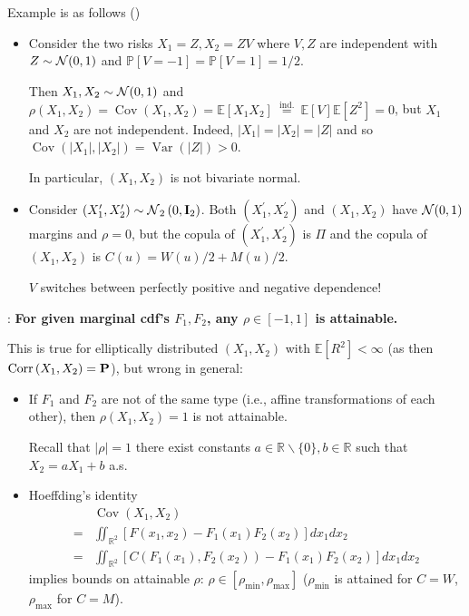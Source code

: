 Example is as follows ()
\begin{itemize}[leftmargin=*]
    \item Consider the two risks $X_{1}=Z, X_{2}=Z V$
where $V, Z$ are independent with $Z \sim \operatorname{\mathcal{N}}(0,1)$ and $\mathbb{P}[V=-1]=\mathbb{P}[V=1]=1 / 2$.

Then $X_{1}, X_{2} \sim \operatorname{\mathcal{N}}(0,1)$ and $\rho\left(X_{1}, X_{2}\right)=\operatorname{Cov}\left(X_{1}, X_{2}\right)=\mathbb{E}\left[X_{1} X_{2}\right] \stackrel{\text { ind. }}{=} \mathbb{E}[V] \mathbb{E}\left[Z^{2}\right]=0$, but $X_{1}$ and $X_{2}$ are not independent. Indeed, 
$\left|X_{1}\right|=\left|X_{2}\right|=|Z|$ and so $ \operatorname{Cov}\left(\left|X_{1}\right|,\left|X_{2}\right|\right)=\operatorname{Var}(|Z|)>0
$.


In particular, $\left(X_{1}, X_{2}\right)$ is not bivariate normal.

    \item Consider $\left(X_{1}^{\prime}, X_{2}^{\prime}\right) \sim \operatorname{\mathcal{N}}_{2}\left(0, \operatorname{\boldsymbol{\mathbf{I}}}_{2}\right)$. Both $\left(X_{1}^{\prime}, X_{2}^{\prime}\right)$ and $\left(X_{1}, X_{2}\right)$ have $\operatorname{\mathcal{N}}(0,1)$ margins and $\rho=0$, but the copula of $\left(X_{1}^{\prime}, X_{2}^{\prime}\right)$ is $\Pi$ and the copula of $\left(X_{1}, X_{2}\right)$ is $C(u)=W(u) / 2+M(u) / 2$.
    
    $V$ switches between perfectly positive and negative dependence!
\end{itemize}


: \textbf{For given marginal cdf's $F_{1}, F_{2}$, any $\rho \in[-1,1]$ is attainable.}

This is true for elliptically distributed $\left(X_{1}, X_{2}\right)$ with $\mathbb{E}\left[R^{2}\right]<\infty$ (as then $\operatorname{Corr}\left(X_{1}, X_{2}\right)=\boldsymbol{\mathbf{P}}$), but wrong in general:
\begin{itemize}[leftmargin=*]
    \item If $F_{1}$ and $F_{2}$ are not of the same type (i.e., affine transformations of each other), then $\rho\left(X_{1}, X_{2}\right)=1$ is not attainable.
    
Recall that $|\rho|=1$  there exist constants $a \in \mathbb{R} \backslash\{0\}, b \in \mathbb{R}$ such that $X_{2}=a X_{1}+b$ a.s.
    \item Hoeffding's identity
$$
\begin{aligned}
&\operatorname{Cov}\left(X_{1}, X_{2}\right) \\
=&\iint_{\mathbb{R}^{2}}\left[F\left(x_{1}, x_{2}\right)-F_{1}\left(x_{1}\right) F_{2}\left(x_{2}\right)\right] d x_{1} d x_{2} \\
=&\iint_{\mathbb{R}^{2}}\left[C\left(F_{1}\left(x_{1}\right), F_{2}\left(x_{2}\right)\right)-F_{1}\left(x_{1}\right) F_{2}\left(x_{2}\right)\right] d x_{1} d x_{2}
\end{aligned}
$$
implies bounds on attainable $\rho$: $\rho \in\left[\rho_{\min }, \rho_{\max }\right]$ ($\rho_{\min}$ is attained for $C=W$, $\rho_{\max}$ for $C=M$).
\end{itemize}


